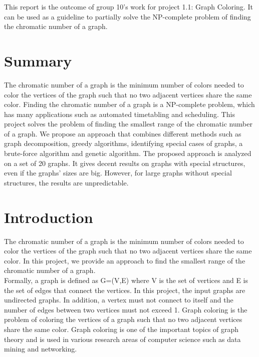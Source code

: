 \documentclass[a4paper]{report}
\begin{document}
	This report is the outcome of group 10's work for project 1.1: Graph Coloring. It can be used as a guideline to partially solve the NP-complete problem of finding the chromatic number of a graph.
	  
	
	\chapter*{Summary}
	The chromatic number of a graph is the minimum number of colors needed to color the vertices of the graph such that no two adjacent vertices share the same color. Finding the chromatic number of a graph is a NP-complete problem, which has many applications such as automated timetabling and scheduling. This project solves the problem of finding the smallest range of the chromatic number of a graph. We propose an approach that combines different methods such as graph decomposition, greedy algorithms, identifying special cases of graphs, a brute-force algorithm and genetic algorithm. The proposed approach is analyzed on a set of 20 graphs. It gives decent results on graphs with special structures, even if the graphs' sizes are big. However, for large graphs without special structures, the results are unpredictable. 
	
	\tableofcontents
	

	
	\chapter{Introduction}
	The chromatic number of a graph is the minimum number of colors needed to color the vertices of the graph such that no two adjacent vertices share the same color. In this project, we provide an approach to find the smallest range of the chromatic number of a graph. \\
	
	Formally, a graph is defined as G=(V,E) where V is the set of vertices and E is the set of edges that connect the vertices. In this project, the input graphs are undirected graphs. In addition, a vertex must not connect to itself and the number of edges between two vertices must not exceed 1.  Graph coloring is the problem of coloring the vertices of a graph such that no two adjacent vertices share the same color. Graph coloring is one of the important topics of graph theory and is used in various research areas of computer science such as data mining and networking.\\
	
\end{document}
